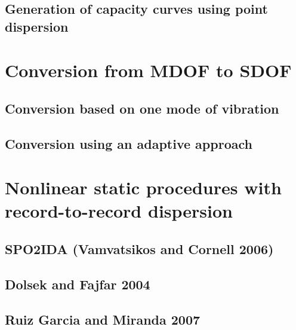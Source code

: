		\subsection{Generation of capacity curves using point dispersion}
		\label{subsec:dispersion}
		
			
	\section{Conversion from MDOF to SDOF}
	\label{sec:mdof_to_sdof}
	
	
		\subsection{Conversion based on one mode of vibration}
		\label{subsec:one_mode}
		
		
		\subsection{Conversion using an adaptive approach}
		\label{subsec:adaptive}
		
			
	\section{Nonlinear static procedures with record-to-record dispersion}
	\label{subsec:NSP}
	
		
		\subsection{SPO2IDA (Vamvatsikos and Cornell 2006)}
		\label{subsec:SPO2IDA}
		
		
		\subsection{Dolsek and Fajfar 2004}
		\label{subsec:DolsekFajfar}
		

		\subsection{Ruiz Garcia and Miranda 2007}
		\label{subsec:RuizGarciaMiranda}
		
		
